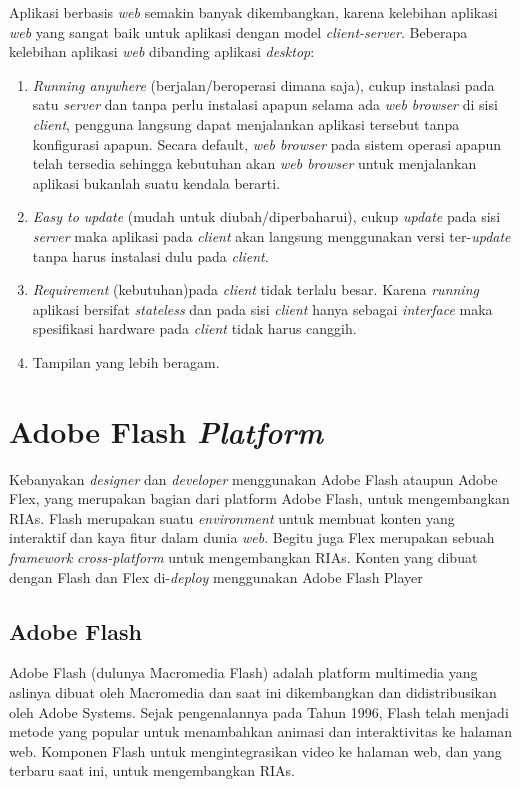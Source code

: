 Aplikasi berbasis \textit{web} semakin banyak dikembangkan, karena kelebihan aplikasi \textit{web} yang sangat baik untuk aplikasi dengan model \textit{client-server}. Beberapa kelebihan aplikasi \textit{web} dibanding aplikasi \textit{desktop}:
\begin{enumerate}
	\item \textit{Running anywhere} (berjalan/beroperasi dimana saja), cukup instalasi pada satu \textit{server} dan tanpa perlu instalasi apapun selama ada \textit{web browser} di sisi \textit{client}, pengguna langsung  dapat menjalankan aplikasi tersebut tanpa konfigurasi apapun. Secara default, \textit{web browser} pada sistem operasi apapun telah tersedia sehingga kebutuhan akan \textit{web browser} untuk menjalankan aplikasi bukanlah suatu kendala berarti.
	\item \textit{Easy to update} (mudah untuk diubah/diperbaharui), cukup \textit{update} pada sisi \textit{server} maka aplikasi pada \textit{client} akan langsung menggunakan versi ter-\textit{update} tanpa harus instalasi dulu pada \textit{client}.
	\item \textit{Requirement} (kebutuhan)pada \textit{client} tidak terlalu besar. Karena \textit{running} aplikasi bersifat \textit{stateless} dan pada sisi \textit{client} hanya sebagai \textit{interface} maka spesifikasi hardware pada \textit{client} tidak harus canggih. 
	\item Tampilan yang lebih beragam.
\end{enumerate} 

\section {Adobe Flash \textit{Platform}}
\label{subsec:adobe_flash_platform}
Kebanyakan \textit{designer} dan \textit{developer} menggunakan Adobe Flash ataupun Adobe Flex, yang merupakan bagian dari platform Adobe Flash, untuk mengembangkan RIAs. Flash merupakan suatu \textit{environment} untuk membuat konten yang interaktif dan kaya fitur dalam dunia \textit{web}. Begitu juga Flex merupakan sebuah \textit{framework} \textit{cross-platform} untuk mengembangkan RIAs. Konten yang dibuat dengan Flash dan Flex di-\textit{deploy} menggunakan Adobe Flash Player

\subsection {Adobe Flash}
\label{subsec:adobe_flash}
Adobe Flash (dulunya Macromedia Flash) adalah platform multimedia yang aslinya dibuat oleh Macromedia dan saat ini dikembangkan dan didistribusikan oleh Adobe Systems. Sejak pengenalannya pada Tahun 1996, Flash telah menjadi metode yang popular untuk menambahkan animasi dan interaktivitas ke halaman web. Komponen Flash untuk mengintegrasikan video ke halaman web, dan yang terbaru saat ini, untuk mengembangkan RIAs.

